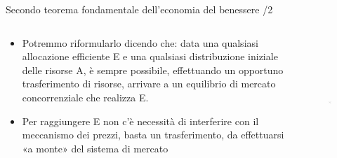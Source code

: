 \documentclass[aspectratio=64,11pt]{beamer}
\begin{document}
\begin{frame}{Secondo teorema fondamentale dell'economia del benessere /2}
\begin{columns}
\begin{column}{.45\columnwidth}
\begin{itemize}
\item Potremmo riformularlo dicendo che: data una qualsiasi allocazione efficiente E e una qualsiasi distribuzione iniziale delle risorse A, è sempre possibile, effettuando un opportuno trasferimento di risorse, arrivare a un equilibrio di mercato concorrenziale che realizza E.
\item Per raggiungere E non c’è necessità di interferire con il meccanismo dei prezzi, basta un trasferimento, da effettuarsi «a monte» del sistema di mercato
\end{itemize}
\end{column}

\begin{column}{.55\columnwidth}
\begin{figure}
\centering
\includegraphics[height=5cm]{./figure/edgeworth-6.pdf}
\end{figure}
\end{column}
\end{columns}
\end{frame}
\end{document}
